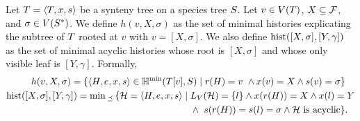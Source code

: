 \begin{definition}
    Let \(T = \left\langle T, x, s\right\rangle\) be a synteny tree on a species tree \(S\).
    Let \(v \in V(T)\), \(X \subseteq \mathcal{F}\), and \(\sigma \in V(S^*)\).
    We define \(h(v, X, \sigma)\) as the set of minimal histories explicating the subtree of \(T\) rooted at \(v\) with \(v = [X, \sigma]\).
    We also define \(\mathrm{hist}([X, \sigma], [Y, \gamma])\) as the set of minimal acyclic histories whose root is \([X, \sigma]\) and whose only visible leaf is \([Y, \gamma]\).
    Formally,
    \begin{align*}
        h(v, X, \sigma) = \{
            \left\langle H, e, x, s\right\rangle
                \in \mathbb{H}^{\mathrm{min}}(T[v], S) \mid
            \begin{aligned}[t]
                & r(H) = v \ \land x(v) = X \land s(v) = \sigma \}
            \end{aligned}
        \\
        \mathrm{hist}([X, \sigma], [Y, \gamma]) = \min{}_{\preceq}\,\{
            \mathcal{H} = \left\langle H, e, x, s\right\rangle \mid
            \begin{aligned}[t]
                & L_V(\mathcal{H}) = \{l\} \land
                x(r(H)) = X \land x(l) = Y \\
                & \land \ s(r(H)) = s(l) = \sigma \land
                \mathcal{H} \text{ is acyclic} \}.
            \end{aligned}
    \end{align*}
\end{definition}

\newcommand{\mergeHist}{\mathcal{M}}


